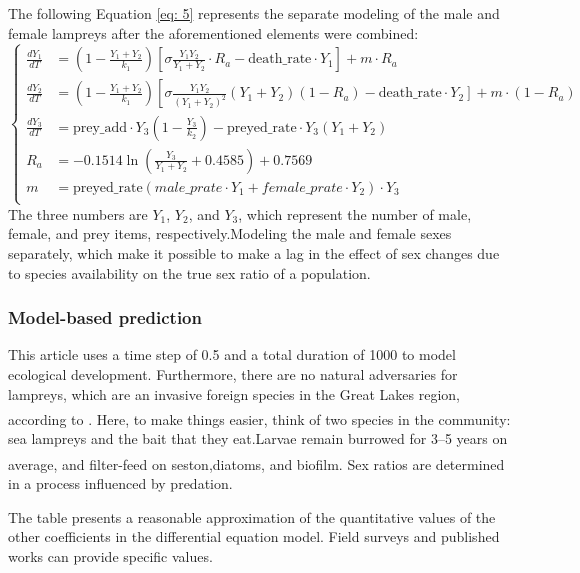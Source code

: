 \documentclass[12pt]{article}  %
\newcommand{\upcite}[1]{\textsuperscript{\textsuperscript{\cite{#1}}}}
\begin{document}
\par
The following Equation \ref{eq: 5} represents the separate modeling of the male and female lampreys after the aforementioned elements were combined:
\begin{equation}
	\left\{
	\begin{aligned}
		\frac{dY_1}{dT} &= \left(1 - \frac{Y_1 + Y_2}{k_1}\right) \left[ \sigma  \frac{Y_1 Y_2}{Y_1 + Y_2} \cdot R_a -  \text{death\_rate} \cdot Y_1\right] + m \cdot R_a  \\	
		\frac{dY_2}{dT} &= \left(1 - \frac{Y_1 + Y_2}{k_1}\right) \left[\sigma \frac{Y_1 Y_2}{(Y_1 + Y_2)^2} (Y_1 + Y_2) \right. \left. (1 - R_a) - \text{death\_rate} \cdot Y_2 \right] + m \cdot (1 - R_a) \\				
		\frac{dY_3}{dT} &= \text{prey\_add} \cdot Y_3 \left(1 - \frac{Y_3}{k_2}\right) - \text{preyed\_rate} \cdot Y_3 (Y_1 + Y_2)\\
		R_a &= -0.1514\ln\left(\frac{Y_3}{Y_1 + Y_2} + 0.4585\right) + 0.7569  \\
		m &= \text{preyed\_rate} (male\_prate \cdot Y_1 + female\_prate \cdot Y_2) \cdot Y_3 \\
	\end{aligned}
	\label{eq: 5}
	\right.
\end{equation}
The three numbers are $Y_1$, $Y_2$, and $Y_3$, which represent the number of male, female, and prey items, respectively.Modeling the male and female sexes separately, which make it possible to make a lag in the effect of sex changes due to species availability on the true sex ratio of a population.

\subsubsection{%
	Model-based prediction}
This article uses a time step of 0.5 and a total duration of 1000 to model ecological development. Furthermore, there are no natural adversaries for lampreys, which are an invasive foreign species in the Great Lakes region, according to \upcite{2}. Here, to make things easier, think of two species in the community: sea lampreys and the bait that they eat.Larvae remain burrowed for 3–5 years on average, and filter-feed on seston,diatoms, and biofilm.\upcite{3} Sex ratios are determined in a process influenced by predation.\par
The table presents a reasonable approximation of the quantitative values of the other coefficients in the differential equation model. Field surveys and published works can provide specific values.
\end{document}
